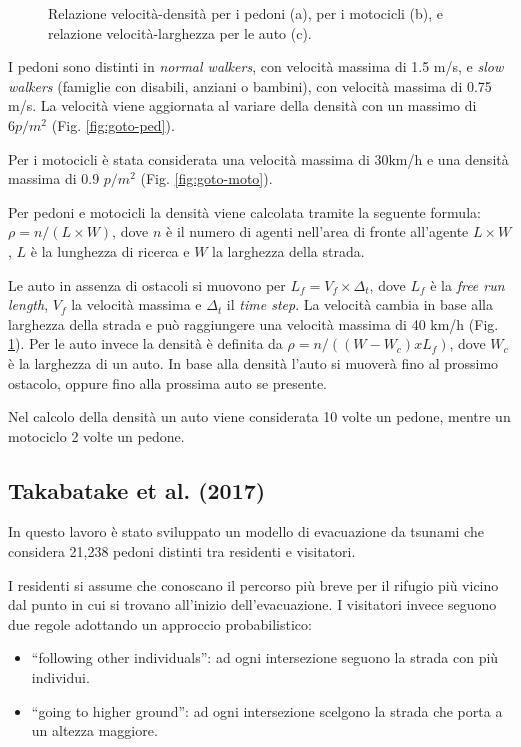 \begin{figure}[ht]
\begin{subfigure}{0.4\textwidth}
        \caption{}
        \label{fig:goto-auto}
    \end{subfigure}
    \caption{Relazione velocità-densità per i pedoni (a), per i motocicli (b), e relazione velocità-larghezza per le auto (c).}
    \label{fig:ankdasndk}
\end{figure}

I pedoni sono distinti in \textit{normal walkers}, con velocità massima di 1.5 m/s, e
\textit{slow walkers} (famiglie con disabili, anziani o bambini), con velocità massima di 0.75 m/s.
%
La velocità viene aggiornata al variare della densità con un massimo di $6 p/m^2$ (Fig. \ref{fig:goto-ped}).

Per i motocicli è stata considerata una velocità massima di 30km/h e una densità massima di 0.9 $p/m^2$ (Fig. \ref{fig:goto-moto}).

Per pedoni e motocicli la densità viene calcolata tramite la seguente formula:
$\rho = n /(L \times W)$, dove $n$ è il numero di agenti nell'area di fronte all'agente $L \times W$, $L$ è la lunghezza di ricerca 
e $W$ la larghezza della strada.

Le auto in assenza di ostacoli si muovono per $L_{f} = V_{f} \times \Delta_{t} $, dove $L_{f}$ è la \textit{free run length},
$V_{f}$ la velocità massima e $\Delta_{t}$ il \textit{time step}.
La velocità cambia in base alla larghezza della strada e può raggiungere una velocità massima di 40 km/h (Fig. \ref{fig:goto-auto}).
Per le auto invece la densità è definita da $\rho = n /((W - W_{c}) x L_{f})$, dove $W_{c}$ è la larghezza di un auto.
In base alla densità l'auto si muoverà fino al prossimo ostacolo, oppure fino alla prossima auto se presente.

Nel calcolo della densità un auto viene considerata 10 volte un pedone, mentre un motociclo 2 volte un pedone.

\subsection{Takabatake et al. (2017)}
In questo lavoro è stato sviluppato un modello di evacuazione da tsunami che considera
21,238 pedoni distinti tra residenti e visitatori.

I residenti si assume che conoscano il percorso più breve
per il rifugio più vicino dal punto in cui si trovano all'inizio dell'evacuazione.
%
I visitatori invece seguono due regole adottando un approccio probabilistico:
\begin{itemize}
    \item “following other individuals”: ad ogni intersezione seguono la strada con più individui.
    \item “going to higher ground”: ad ogni intersezione scelgono la strada che porta a un altezza maggiore.
\end{itemize}

